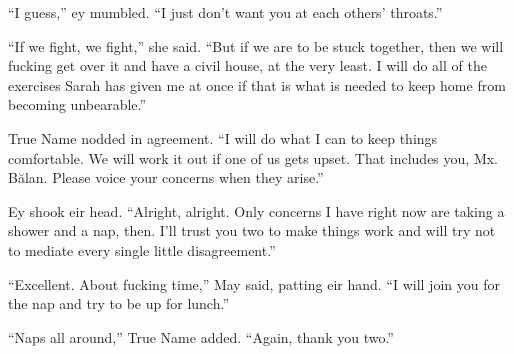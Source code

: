 ``I guess,'' ey mumbled. ``I just don't want you at each others' throats.''

``If we fight, we fight,'' she said. ``But if we are to be stuck together, then we will fucking get over it and have a civil house, at the very least. I will do all of the exercises Sarah has given me at once if that is what is needed to keep home from becoming unbearable.''

True Name nodded in agreement. ``I will do what I can to keep things comfortable. We will work it out if one of us gets upset. That includes you, Mx. Bălan. Please voice your concerns when they arise.''

Ey shook eir head. ``Alright, alright. Only concerns I have right now are taking a shower and a nap, then. I'll trust you two to make things work and will try not to mediate every single little disagreement.''

``Excellent. About fucking time,'' May said, patting eir hand. ``I will join you for the nap and try to be up for lunch.''

``Naps all around,'' True Name added. ``Again, thank you two.''
